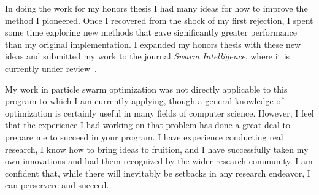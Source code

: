 \documentclass[onecolumn, 12pt]{article}
\begin{document}
In doing the work for my honors thesis I had many ideas for how to improve the
method I pioneered.  Once I recovered from the shock of my first rejection, I
spent some time exploring new methods that gave significantly greater
performance than my original implementation.  I expanded my honors thesis with
these new ideas and submitted my work to the journal \emph{Swarm Intelligence},
where it is currently under
review~\cite{gardner-2010-speculative-approach-to-parallelization-pso}.

My work in particle swarm optimization was not directly applicable to this
program to which I am currently applying, though a general knowledge of
optimization is certainly useful in many fields of computer science.  However,
I feel that the experience I had working on that problem has done a great deal
to prepare me to succeed in your program.  I have experience conducting real
research, I know how to bring ideas to fruition, and I have successfully taken
my own innovations and had them recognized by the wider research community.
I am confident that, while there will inevitably be setbacks in any research
endeavor, I can perservere and succeed.



\end{document}
